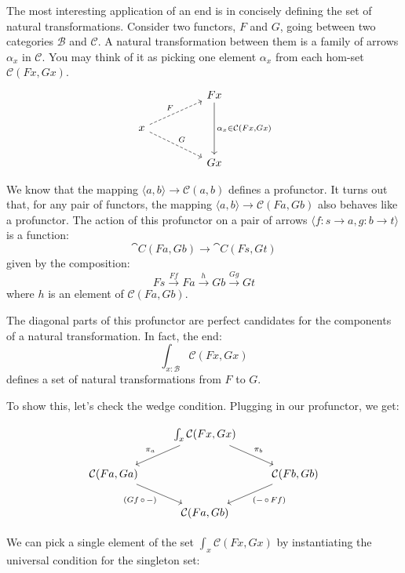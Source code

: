 \documentclass[DaoFP]{subfiles}
\begin{document}
The most interesting application of an end is in concisely defining the set of natural transformations. Consider two functors, $F$ and $G$, going between two categories  $\mathcal{B}$ and $\mathcal{C}$. A natural transformation between them is a family of arrows $\alpha_x$ in $\mathcal{C}$. You may think of it as picking one element $\alpha_x$ from each hom-set  $\mathcal{C} (F x, G x)$.
\[
 \begin{tikzcd}
 && F x
 \arrow[dd, "{\alpha_x \in \cat C (F x, G x)}"]
 \\
 x
 \arrow[urr, dashed, "F"]
 \arrow[drr, dashed, "G"]
 \\
 && G x
 \end{tikzcd}
\]

We know that the mapping $\langle a, b \rangle \to \mathcal{C} (a, b)$ defines a profunctor.  It turns out that, for any pair of functors, the mapping  $\langle a, b \rangle \to \mathcal{C} (F a, G b)$ also behaves like a profunctor. The action of this profunctor on a pair of arrows $\langle f \colon s \to a, g \colon b \to t \rangle$ is a function:
\[ \cat C(F a, G b) \to \cat C (F s, G t) \]
given by the composition:
\[ F s \xrightarrow{F f} F a \xrightarrow{h} G b \xrightarrow{G g} G t \]
where $h$ is an  element of $ \mathcal{C} (F a, G b)$.

The diagonal parts of this profunctor are perfect candidates for the components of a natural transformation. In fact, the end:
\[  \int_{x \colon  \mathcal{B}} \mathcal{C}(F x, G x) \]
defines a set of natural transformations from $F$ to $G$.

To show this, let's check the wedge condition. Plugging in our profunctor, we get:

\[
 \begin{tikzcd}
 & \int_{x} \mathcal{C}(F x, G x)
 \arrow[ld, "\pi_a"']
 \arrow[rd, "\pi_b"]
 \\
  \mathcal{C} ( F a, G a )
 \arrow[dr, "{(G f \, \circ \, -)}"']
 && \mathcal{C} ( F b, G b )
 \arrow[dl, "{(- \, \circ\, F f)}"]
 \\
 &  \mathcal{C} ( F a, G b )
 \end{tikzcd}
\]

We can pick a single element of the set $\int_{x} \mathcal{C}(F x, G x)$ by instantiating the universal condition for the singleton set:
\end{document}

